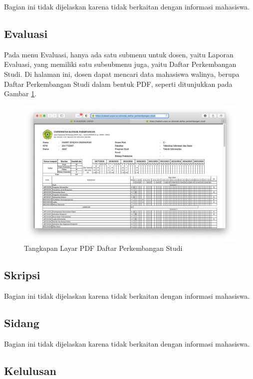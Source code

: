 Bagian ini tidak dijelaskan karena tidak berkaitan dengan informasi mahasiswa.

\subsection{Evaluasi}

Pada menu Evaluasi, hanya ada satu submenu untuk dosen, yaitu Laporan Evaluasi, yang memiliki satu subsubmenu juga, yaitu Daftar Perkembangan Studi. Di halaman ini, dosen dapat mencari data mahasiswa walinya, berupa Daftar Perkembangan Studi dalam bentuk PDF, seperti ditunjukkan pada Gambar \ref{fig:3_siakad_dps_detail}.

\begin{figure}[H]
    \centering
    \includegraphics[scale=0.35]{Gambar/siakad_dps_detail.png}
    \caption{Tangkapan Layar PDF Daftar Perkembangan Studi}
    \label{fig:3_siakad_dps_detail}
\end{figure}

\subsection{Skripsi}

Bagian ini tidak dijelaskan karena tidak berkaitan dengan informasi mahasiswa.

\subsection{Sidang}

Bagian ini tidak dijelaskan karena tidak berkaitan dengan informasi mahasiswa.

\subsection{Kelulusan}

